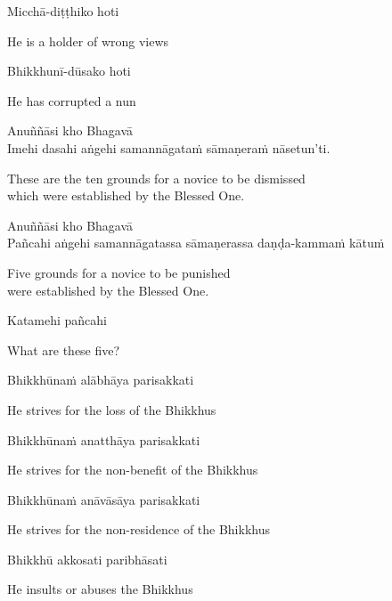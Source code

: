 Micchā-diṭṭhiko hoti

\begin{cprenglish}
  He is a holder of wrong views
\end{cprenglish}

Bhikkhunī-dūsako hoti

\begin{cprenglish}
  He has corrupted a nun
\end{cprenglish}

Anuññāsi kho Bhagavā\\
Imehi dasahi aṅgehi samannāgataṁ sāmaṇeraṁ nāsetun'ti.

\begin{cprenglish}
  These are the ten grounds for a novice to be dismissed\\
  which were established by the Blessed One. 
\end{cprenglish}

Anuññāsi kho Bhagavā\\
Pañcahi aṅgehi samannāgatassa sāmaṇerassa daṇḍa-kammaṁ kātuṁ

\begin{cprenglish}
  Five grounds for a novice to be punished\\
  were established by the Blessed One.
\end{cprenglish}

Katamehi pañcahi

\begin{cprenglish}
  What are these five?
\end{cprenglish}

Bhikkhūnaṁ alābhāya parisakkati

\begin{cprenglish}
  He strives for the loss of the Bhikkhus
\end{cprenglish}

Bhikkhūnaṁ anatthāya parisakkati

\begin{cprenglish}
  He strives for the non-benefit of the Bhikkhus
\end{cprenglish}

Bhikkhūnaṁ anāvāsāya parisakkati

\begin{cprenglish}
  He strives for the non-residence of the Bhikkhus
\end{cprenglish}

Bhikkhū akkosati paribhāsati

\begin{cprenglish}
  He insults or abuses the Bhikkhus
\end{cprenglish}

